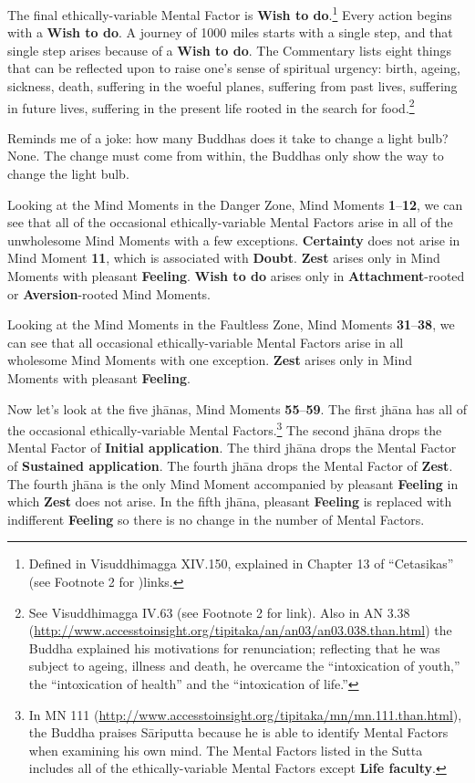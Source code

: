 The final ethically-variable Mental Factor is \textbf{Wish to do}.\footnote{Defined in Visuddhimagga XIV.150, explained in Chapter 13 of “Cetasikas” (see Footnote 2 for )links.} Every action begins with a \textbf{Wish to do}. A journey of 1000 miles starts with a single step, and that single step arises because of a \textbf{Wish to do}. The Commentary lists eight things that can be reflected upon to raise one’s sense of spiritual urgency: birth, ageing, sickness, death, suffering in the woeful planes, suffering from past lives, suffering in future lives, suffering in the present life rooted in the search for food.\footnote{See Visuddhimagga IV.63 (see Footnote 2 for link). Also in AN 3.38 (\url{http://www.accesstoinsight.org/tipitaka/an/an03/an03.038.than.html}) the Buddha explained his motivations for renunciation; reflecting that he was subject to ageing, illness and death, he overcame the “intoxication of youth,” the “intoxication of health” and the “intoxication of life.”}

Reminds me of a joke: how many Buddhas does it take to change a light bulb? None. The change must come from within, the Buddhas only show the way to change the light bulb.

Looking at the Mind Moments in the Danger Zone, Mind Moments \textbf{1}--\textbf{12}, we can see that all of the occasional ethically-variable Mental Factors arise in all of the unwholesome Mind Moments with a few exceptions. \textbf{Certainty} does not arise in Mind Moment \textbf{11}, which is associated with \textbf{Doubt}. \textbf{Zest} arises only in Mind Moments with pleasant \textbf{Feeling}. \textbf{Wish to do} arises only in \textbf{Attachment}-rooted or \textbf{Aversion}-rooted Mind Moments.

Looking at the Mind Moments in the Faultless Zone, Mind Moments \textbf{31}--\textbf{38}, we can see that all occasional ethically-variable Mental Factors arise in all wholesome Mind Moments with one exception. \textbf{Zest} arises only in Mind Moments with pleasant \textbf{Feeling}.

Now let’s look at the five jhānas, Mind Moments \textbf{55}--\textbf{59}. The first jhāna has all of the occasional ethically-variable Mental Factors.\footnote{In MN 111 (\url{http://www.accesstoinsight.org/tipitaka/mn/mn.111.than.html}), the Buddha praises Sāriputta because he is able to identify Mental Factors when examining his own mind. The Mental Factors listed in the Sutta includes all of the ethically-variable Mental Factors except \textbf{Life faculty}.} The second jhāna drops the Mental Factor of \textbf{Initial application}. The third jhāna drops the Mental Factor of \textbf{Sustained application}. The fourth jhāna drops the Mental Factor of \textbf{Zest}. The fourth jhāna is the only Mind Moment accompanied by pleasant \textbf{Feeling} in which \textbf{Zest} does not arise. In the fifth jhāna, pleasant \textbf{Feeling} is replaced with indifferent \textbf{Feeling} so there is no change in the number of Mental Factors.

